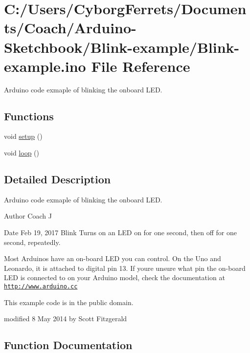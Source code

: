 \hypertarget{_blink-example_8ino}{}\section{C\+:/\+Users/\+Cyborg\+Ferrets/\+Documents/\+Coach/\+Arduino-\/\+Sketchbook/\+Blink-\/example/\+Blink-\/example.ino File Reference}
\label{_blink-example_8ino}


Arduino code exmaple of blinking the onboard L\+ED.  


\subsection*{Functions}
\begin{DoxyCompactItemize}
\item 
void \hyperlink{_blink-example_8ino_a4fc01d736fe50cf5b977f755b675f11d}{setup} ()
\item 
void \hyperlink{_blink-example_8ino_afe461d27b9c48d5921c00d521181f12f}{loop} ()
\end{DoxyCompactItemize}


\subsection{Detailed Description}
Arduino code exmaple of blinking the onboard L\+ED. 

\begin{DoxyAuthor}{Author}
Coach J 
\end{DoxyAuthor}
\begin{DoxyDate}{Date}
Feb 19, 2017 Blink Turns on an L\+ED on for one second, then off for one second, repeatedly.
\end{DoxyDate}
Most Arduinos have an on-\/board L\+ED you can control. On the Uno and Leonardo, it is attached to digital pin 13. If you\textquotesingle{}re unsure what pin the on-\/board L\+ED is connected to on your Arduino model, check the documentation at \href{http://www.arduino.cc}{\tt http\+://www.\+arduino.\+cc}

This example code is in the public domain.

modified 8 May 2014 by Scott Fitzgerald 

\subsection{Function Documentation}
\mbox{\label{_blink-example_8ino_afe461d27b9c48d5921c00d521181f12f}} 
